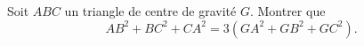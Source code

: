 Soit $ABC$ un triangle de centre de gravité $G$. Montrer que
\[
AB^2 + BC^2 + CA^2 = 3\left(GA^2 + GB^2 + GC^2\right).
\]
